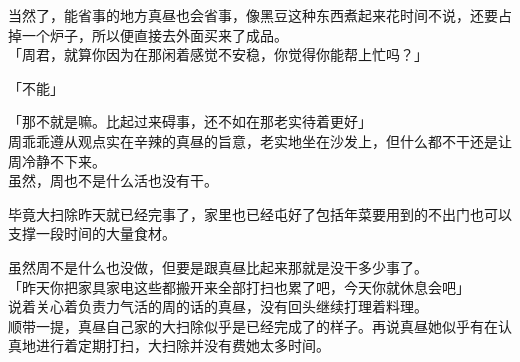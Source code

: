 当然了，能省事的地方真昼也会省事，像黑豆这种东西煮起来花时间不说，还要占掉一个炉子，所以便直接去外面买来了成品。\\

「周君，就算你因为在那闲着感觉不安稳，你觉得你能帮上忙吗？」

「不能」

「那不就是嘛。比起过来碍事，还不如在那老实待着更好」\\

周乖乖遵从观点实在辛辣的真昼的旨意，老实地坐在沙发上，但什么都不干还是让周冷静不下来。\\

虽然，周也不是什么活也没有干。

毕竟大扫除昨天就已经完事了，家里也已经屯好了包括年菜要用到的不出门也可以支撑一段时间的大量食材。

虽然周不是什么也没做，但要是跟真昼比起来那就是没干多少事了。\\

「昨天你把家具家电这些都搬开来全部打扫也累了吧，今天你就休息会吧」\\

说着关心着负责力气活的周的话的真昼，没有回头继续打理着料理。\\

顺带一提，真昼自己家的大扫除似乎是已经完成了的样子。再说真昼她似乎有在认真地进行着定期打扫，大扫除并没有费她太多时间。\\


